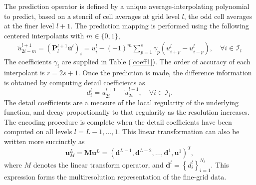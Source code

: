 \documentclass[]{article}
\begin{document}
        The prediction operator is defined by a unique average-interpolating
        polynomial to predict, based on a stencil of cell averages at grid level
        $l$, the odd cell averages at the finer level $l+1$. The prediction
        mapping is performed using the following centered interpolants with
        $m\in\{0,1\}$,
        \begin{align}
            \tilde{u}_{2i-m}^{l+1} = \left( \bm{P}_{l}^{l+1}
            \overline{\bm{u}}^{l} \right)_{i} = u_{i}^{l} - (-1)^{m} \sum_{p=1}^{s} \gamma_{p} \left(
                u^{l}_{i+p} - u^{l}_{i-p} \right), \quad \forall i \in \bm{\mathcal{I}}_{l}
            \label{prediction}
        \end{align}
        The coefficients $\gamma_{i}$ are supplied in Table (\ref{coeff1}). The
        order of accuracy of each interpolant is $r=2s+1$. Once the prediction is
        made, the difference information is obtained by computing detail
        coefficients as
        \begin{equation}
            d^{l}_{i} = u^{l+1}_{2i} - \tilde{u}^{l+1}_{2i}, \quad \forall i \in \bm{\mathcal{I}}_{l}.
        \end{equation}
        The detail coefficients are a measure of the local regularity of the
        underlying function, and decay proportionally to that regularity as the
        resolution increases. The encoding procedure is complete
        when the detail coefficients have been computed on all levels
        $l=L-1,\dots,1$. This linear transformation can also be written more
        succinctly as
        \begin{equation}
            \bm{u}^{L}_{M} = \bm{M} \bm{u}^{L} = \left( \bm{d}^{L-1}, \bm{d}^{L-2},
            \dots, \bm{d}^{1}, \bm{u}^{1} \right)^{T},
            \label{transform}
        \end{equation}
        where $M$ denotes the linear transform operator, and $\bm{d}^{l} =
        \left\{d^{l}_{i}\right\}_{i=1}^{N_{l}}$. This expression forms the
        multiresolution representation of the fine-grid data.
\end{document}
